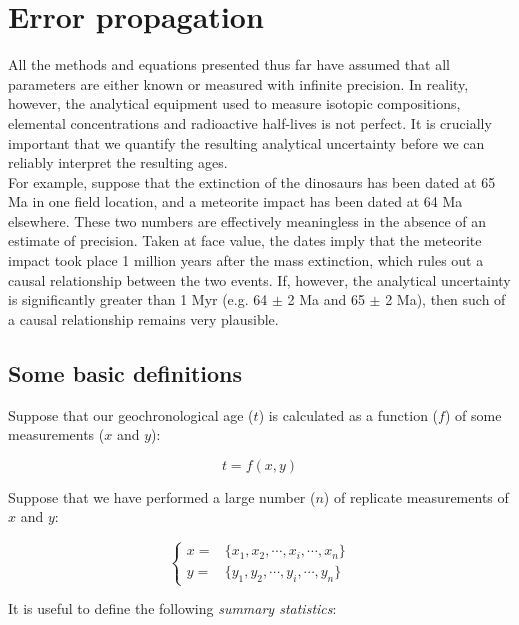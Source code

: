 \chapter{Error propagation}
\label{ch:error-propagation}

All the methods and equations presented thus far have assumed that all
parameters are either known or measured with infinite precision. In
reality, however, the analytical equipment used to measure isotopic
compositions, elemental concentrations and radioactive half-lives is
not perfect.  It is crucially important that we quantify the resulting
analytical uncertainty before we can reliably interpret the resulting
ages.\\

For example, suppose that the extinction of the dinosaurs has been
dated at 65 Ma in one field location, and a meteorite impact has been
dated at 64 Ma elsewhere.  These two numbers are effectively
meaningless in the absence of an estimate of precision. Taken at face
value, the dates imply that the meteorite impact took place 1 million
years after the mass extinction, which rules out a causal relationship
between the two events. If, however, the analytical uncertainty is
significantly greater than 1 Myr (e.g. 64 $\pm$ 2 Ma and 65 $\pm$ 2
Ma), then such of a causal relationship remains very plausible.

\section{Some basic definitions}
\label{sec:summarystatistics}

Suppose that our geochronological age ($t$) is calculated as a function
($f$) of some measurements ($x$ and $y$):

\begin{equation}
t = f(x,y)
\label{eq:tfxy}
\end{equation}

Suppose that we have performed a large number ($n$) of replicate
measurements of $x$ and $y$:

\begin{equation}
\left\{
\begin{array}{rl}
x = & \{x_1, x_2, \cdots, x_i, \cdots, x_n\} \\
y = & \{y_1, y_2, \cdots, y_i, \cdots, y_n\}
\end{array}
\right.
\label{eq:xy}
\end{equation}

It is useful to define the following \emph{summary statistics}:

